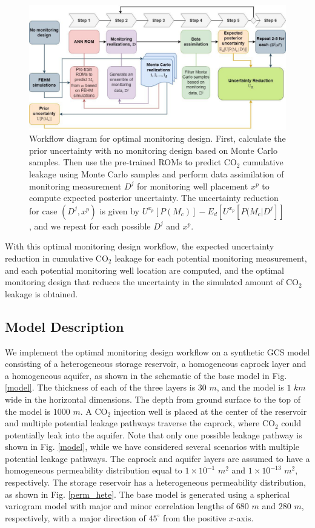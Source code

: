 \documentclass[a4paper,fleqn]{cas-sc}
\begin{document}
\begin{figure}
    \centering
    \includegraphics[width=16.5cm]{figs/Figure 4.pdf}
    \caption{Workflow diagram for optimal monitoring design. First, calculate the prior uncertainty with no monitoring design based on Monte Carlo samples. Then use the pre-trained ROMs to predict CO$_2$ cumulative leakage using Monte Carlo samples and perform data assimilation of monitoring measurement $D^j$ for monitoring well placement $x^p$ to compute expected posterior uncertainty. The uncertainty reduction for case $(D^j,x^p)$ is given by $U^{x_p}[P(M_c)] - E_d[U^{x_p}[P(M_c \vert D^j]]$, and we repeat for each possible $D^j$ and $x^p$.}
    \label{opt_workflow}
\end{figure}

With this optimal monitoring design workflow, the expected uncertainty reduction in cumulative CO$_2$ leakage for each potential monitoring measurement, and each potential monitoring well location are computed, and the optimal monitoring design that reduces the uncertainty in the simulated amount of CO$_2$ leakage is obtained.

\subsection{Model Description}
We implement the optimal monitoring design workflow on a synthetic GCS model consisting of a heterogeneous storage reservoir, a homogeneous caprock layer and a homogeneous aquifer, as shown in the schematic of the base model in Fig. \ref{model}. The thickness of each of the three layers is $30$ $m$, and the model is $1$ $km$ wide in the horizontal dimensions. The depth from ground surface to the top of the model is $1000$ $m$. A CO$_2$ injection well is placed at the center of the reservoir and multiple potential leakage pathways traverse the caprock, where CO$_2$ could potentially leak into the aquifer. Note that only one possible leakage pathway is shown in Fig. \ref{model}, while we have considered several scenarios with multiple potential leakage pathways. The caprock and aquifer layers are assumed to have a homogeneous permeability distribution equal to $1\times10^{-1}$ $m^2$ and $1\times10^{-13}$ $m^2$, respectively. The storage reservoir has a heterogeneous permeability distribution, as shown in Fig. \ref{perm_hete}. The base model is generated using a spherical variogram model \citep{Caers2005, Chen2017623} with major and minor correlation lengths of $680$ $m$ and $280$ $m$, respectively, with a major direction of $45^\circ$ from the positive $x$-axis.
\end{document}
